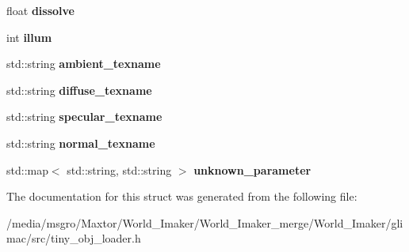 \begin{DoxyCompactItemize}
float {\bfseries dissolve}
\item 
\mbox{\label{structtinyobj_1_1material__t_af846245315bd70c1a4f815dfdd6b80cc}} 
int {\bfseries illum}
\item 
\mbox{\label{structtinyobj_1_1material__t_ae988eed637f368374becbb672798a45e}} 
std\+::string {\bfseries ambient\+\_\+texname}
\item 
\mbox{\label{structtinyobj_1_1material__t_ad7f71a301a261fca07d2e50edccc792d}} 
std\+::string {\bfseries diffuse\+\_\+texname}
\item 
\mbox{\label{structtinyobj_1_1material__t_aed8c38d64472ba0db5186dba800b1b34}} 
std\+::string {\bfseries specular\+\_\+texname}
\item 
\mbox{\label{structtinyobj_1_1material__t_a7512ccf46044357bea1739d583871578}} 
std\+::string {\bfseries normal\+\_\+texname}
\item 
\mbox{\label{structtinyobj_1_1material__t_a18b700227c94d410ed1aa550c7fa9226}} 
std\+::map$<$ std\+::string, std\+::string $>$ {\bfseries unknown\+\_\+parameter}
\end{DoxyCompactItemize}


The documentation for this struct was generated from the following file\+:\begin{DoxyCompactItemize}
\item 
/media/msgro/\+Maxtor/\+World\+\_\+\+Imaker/\+World\+\_\+\+Imaker\+\_\+merge/\+World\+\_\+\+Imaker/glimac/src/tiny\+\_\+obj\+\_\+loader.\+h\end{DoxyCompactItemize}
